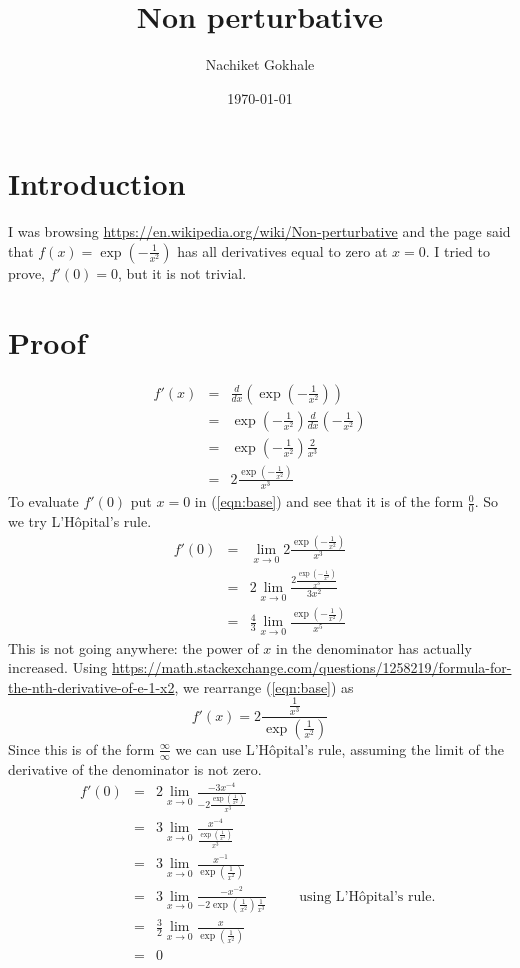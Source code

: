 \documentclass{article}
\newcommand{\beq}{\begin{equation}}
\newcommand{\eeq}{\end{equation}}
\newcommand{\ber}{\begin{eqnarray}}
\newcommand{\eer}{\end{eqnarray}}
\newcommand{\dd}[2]{\frac{d}{d{#2}}{(#1)} }
\newcommand{\limz}{\lim_{x\rightarrow{0}}}
\begin{document}
\title{Non perturbative}
\author{Nachiket Gokhale}
\date{\today}
\maketitle
\section{Introduction}
I was browsing \url{https://en.wikipedia.org/wiki/Non-perturbative} and the page said that $f(x)=\exp(-\frac{1}{x^2})$ has all derivatives equal to zero at $x=0$. I tried to prove, $f'(0)=0$, but it is not trivial.
\section{Proof}
\ber
f'(x) &=& \dd{\exp(-\frac{1}{x^2})}{x} \\
      &=& \exp(-\frac{1}{x^2}) \dd{-\frac{1}{x^2}}{x} \\
      &=& \exp(-\frac{1}{x^2})\frac{2}{x^3} \\
      &=& 2\frac{\exp(-\frac{1}{x^2})}{x^3} \label{eqn:base}
\eer
To evaluate $f'(0)$ put $x=0$ in (\ref{eqn:base}) and see that it is of the form $\frac{0}{0}$. So we try L'H\^{o}pital's rule.
\ber
f'(0) &=& \lim_{x\rightarrow{0}}2\frac{\exp(-\frac{1}{x^2})}{x^3} \\
&=& 2\lim_{x\rightarrow{0}}\frac{2\frac{\exp(-\frac{1}{x^2})}{x^3}}{3x^2} \\
&=& \frac{4}{3}\lim_{x\rightarrow{0}}\frac{\exp(-\frac{1}{x^2})}{x^5}
\eer
This is not going anywhere: the power of $x$ in the denominator has actually increased. Using \url{https://math.stackexchange.com/questions/1258219/formula-for-the-nth-derivative-of-e-1-x2}, we rearrange (\ref{eqn:base}) as
\beq
f'(x) = 2\frac{\frac{1}{x^3}}{\exp(\frac{1}{x^2})} 
\eeq
Since this is of the form $\frac{\infty}{\infty}$ we can use L'H\^{o}pital's rule, assuming the limit of the derivative of the denominator is not zero.
\ber
f'(0) &=& 2 \limz \frac{ -3x^{-4}}{-2\frac{\exp(\frac{1}{x^2})}{x^3}} \\
&=& 3 \limz \frac{ x^{-4}}{\frac{ \exp(\frac{1}{x^2})}{x^3}}   \\
&=& 3 \limz \frac{ x^{-1}}{ \exp(\frac{1}{x^2})} \\
&=& 3 \limz \frac{ -x^{-2}}{ -2\exp(\frac{1}{x^2})\frac{1}{x^3}} \qquad \text{ using L'H\^{o}pital's rule. }\\
&=& \frac{3}{2}\limz \frac{x}{\exp(\frac{1}{x^2})}\\
&=& 0
\eer
\end{document}
